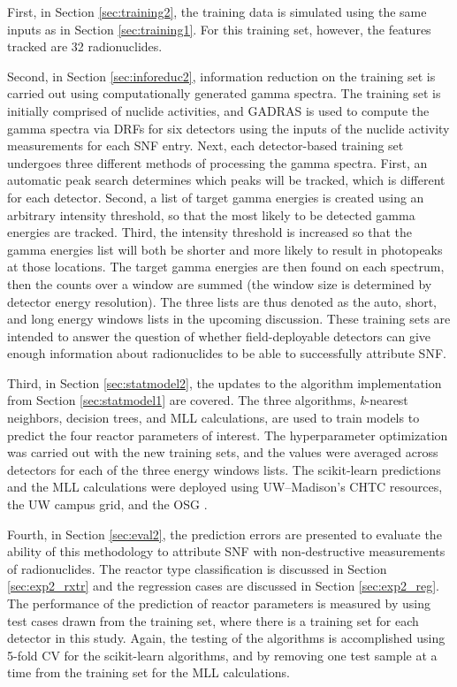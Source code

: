 First, in Section \ref{sec:training2}, the training data is simulated using the
same inputs as in Section \ref{sec:training1}. For this training set, however,
the features tracked are 32 radionuclides.

Second, in Section \ref{sec:inforeduc2}, information reduction on the training
set is carried out using computationally generated gamma spectra.  The training
set is initially comprised of nuclide activities, and \gls{GADRAS} is used to
compute the gamma spectra via \gls{DRF}s for six detectors \cite{gadras} using
the inputs of the nuclide activity measurements for each \gls{SNF} entry.
Next, each detector-based training set undergoes three different methods of
processing the gamma spectra. First, an automatic peak search determines which
peaks will be tracked, which is different for each detector. Second, a list of
target gamma energies is created using an arbitrary intensity threshold, so
that the most likely to be detected gamma energies are tracked. Third, the
intensity threshold is increased so that the gamma energies list will both be
shorter and more likely to result in photopeaks at those locations.  The target
gamma energies are then found on each spectrum, then the counts over a window
are summed (the window size is determined by detector energy resolution). The
three lists are thus denoted as the auto, short, and long energy windows lists
in the upcoming discussion.  These training sets are intended to answer the
question of whether field-deployable detectors can give enough information
about radionuclides to be able to successfully attribute \gls{SNF}. 

Third, in Section \ref{sec:statmodel2}, the updates to the algorithm
implementation from Section \ref{sec:statmodel1} are covered. The three
algorithms, \textit{k}-nearest neighbors, decision trees, and \gls{MLL}
calculations, are used to train models to predict the four reactor parameters
of interest. The hyperparameter optimization was carried out with the new
training sets, and the values were averaged across detectors for each of the
three energy windows lists.  The scikit-learn predictions and the \gls{MLL}
calculations were deployed using \gls{UW}--Madison's \gls{CHTC} resources, the
\gls{UW} campus grid, and the \gls{OSG} \cite{osg07, osg09}.  

Fourth, in Section \ref{sec:eval2}, the prediction errors are presented to
evaluate the ability of this methodology to attribute \gls{SNF} with
non-destructive measurements of radionuclides. The reactor type classification
is discussed in Section \ref{sec:exp2_rxtr} and the regression cases are
discussed in Section \ref{sec:exp2_reg}.  The performance of the prediction of
reactor parameters is measured by using test cases drawn from the training set,
where there is a training set for each detector in this study.  Again, the
testing of the algorithms is accomplished using 5-fold \gls{CV} for the
scikit-learn algorithms, and by removing one test sample at a time from the
training set for the \gls{MLL} calculations.

